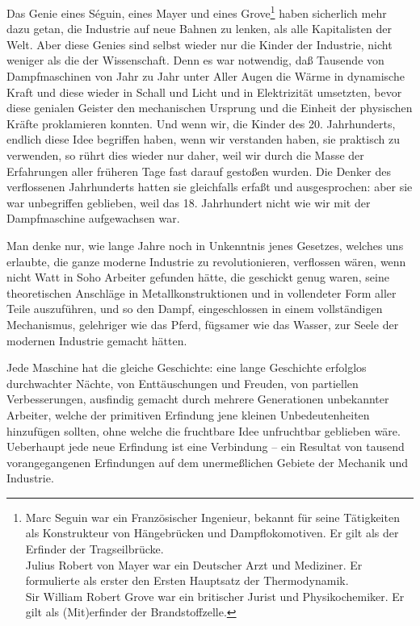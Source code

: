 \documentclass{scrbook}
\begin{document}
Das Genie eines Séguin, eines Mayer und eines Grove\footnote{Marc Seguin war ein Französischer Ingenieur, bekannt für seine Tätigkeiten als Konstrukteur von Hängebrücken und Dampflokomotiven. Er gilt als der Erfinder der Tragseilbrücke.\\Julius Robert von Mayer war ein Deutscher Arzt und Mediziner. Er formulierte als erster den Ersten Hauptsatz der Thermodynamik.\\Sir William Robert Grove war ein britischer Jurist und Physikochemiker. Er gilt als (Mit)erfinder der Brandstoffzelle.} haben sicherlich mehr dazu getan, die Industrie auf neue Bahnen zu lenken, als alle Kapitalisten der Welt. Aber diese Genies sind selbst wieder nur die Kinder der Industrie, nicht weniger als die der Wissenschaft. Denn es war notwendig, daß Tausende von Dampfmaschinen von Jahr zu Jahr unter Aller Augen die Wärme in dynamische Kraft und diese wieder in Schall und Licht und in Elektrizität umsetzten, bevor diese genialen Geister den mechanischen Ursprung und die Einheit der physischen Kräfte proklamieren konnten. Und wenn wir, die Kinder des 20. Jahrhunderts, endlich diese Idee begriffen haben, wenn wir verstanden haben, sie praktisch zu verwenden, so rührt dies wieder nur daher, weil wir durch die Masse der Erfahrungen aller früheren Tage fast darauf gestoßen wurden. Die Denker des verflossenen Jahrhunderts hatten sie gleichfalls erfaßt und ausgesprochen: aber sie war unbegriffen geblieben, weil das 18. Jahrhundert nicht wie wir mit der Dampfmaschine aufgewachsen war.

Man denke nur, wie lange Jahre noch in Unkenntnis jenes Gesetzes, welches uns erlaubte, die ganze moderne Industrie zu revolutionieren, verflossen wären, wenn nicht Watt in Soho Arbeiter gefunden hätte, die geschickt genug waren, seine theoretischen Anschläge in Metallkonstruktionen und in vollendeter Form aller Teile auszuführen, und so den Dampf, eingeschlossen in einem vollständigen Mechanismus, gelehriger wie das Pferd, fügsamer wie das Wasser, zur Seele der modernen Industrie gemacht hätten.

Jede Maschine hat die gleiche Geschichte: eine lange Geschichte erfolglos durchwachter Nächte, von Enttäuschungen und Freuden, von partiellen Verbesserungen, ausfindig gemacht durch mehrere Generationen unbekannter Arbeiter, welche der primitiven Erfindung jene kleinen Unbedeutenheiten hinzufügen sollten, ohne welche die fruchtbare Idee unfruchtbar geblieben wäre. Ueberhaupt jede neue Erfindung ist eine Verbindung – ein Resultat von tausend vorangegangenen Erfindungen auf dem unermeßlichen Gebiete der Mechanik und Industrie.
\end{document}
